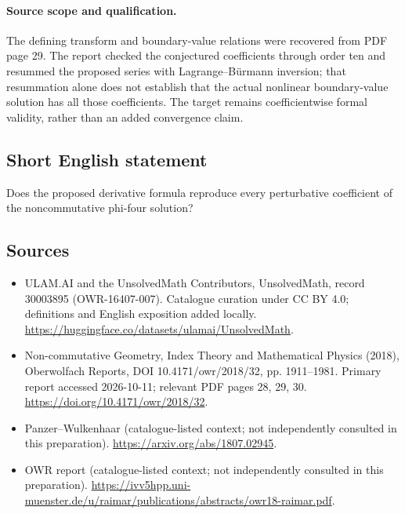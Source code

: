 \documentclass[11pt]{article}
\begin{document}
\paragraph{Source scope and qualification.}
The defining transform and boundary-value relations were recovered from PDF page 29. The report checked the conjectured coefficients through order ten and resummed the proposed series with Lagrange--B\"urmann inversion; that resummation alone does not establish that the actual nonlinear boundary-value solution has all those coefficients. The target remains coefficientwise formal validity, rather than an added convergence claim.
\subsection{Short English statement}
Does the proposed derivative formula reproduce every perturbative coefficient of the noncommutative phi-four solution?
\subsection{Sources}
\begin{itemize}
\item[\hypertarget{source:30003895:1}{S1}] ULAM.AI and the UnsolvedMath Contributors, UnsolvedMath, record 30003895 (OWR-16407-007). Catalogue curation under CC BY 4.0; definitions and English exposition added locally.
\url{https://huggingface.co/datasets/ulamai/UnsolvedMath}.
\item[\hypertarget{source:30003895:2}{S2}] Non-commutative Geometry, Index Theory and Mathematical Physics (2018), Oberwolfach Reports, DOI 10.4171/owr/2018/32, pp. 1911--1981. Primary report accessed 2026-10-11; relevant PDF pages 28, 29, 30.
\url{https://doi.org/10.4171/owr/2018/32}.
\item[\hypertarget{source:30003895:3}{S3}] Panzer--Wulkenhaar (catalogue-listed context; not independently consulted in this preparation).
\url{https://arxiv.org/abs/1807.02945}.
\item[\hypertarget{source:30003895:4}{S4}] OWR report (catalogue-listed context; not independently consulted in this preparation).
\url{https://ivv5hpp.uni-muenster.de/u/raimar/publications/abstracts/owr18-raimar.pdf}.
\end{itemize}
\label{end:30003895}
\end{document}
